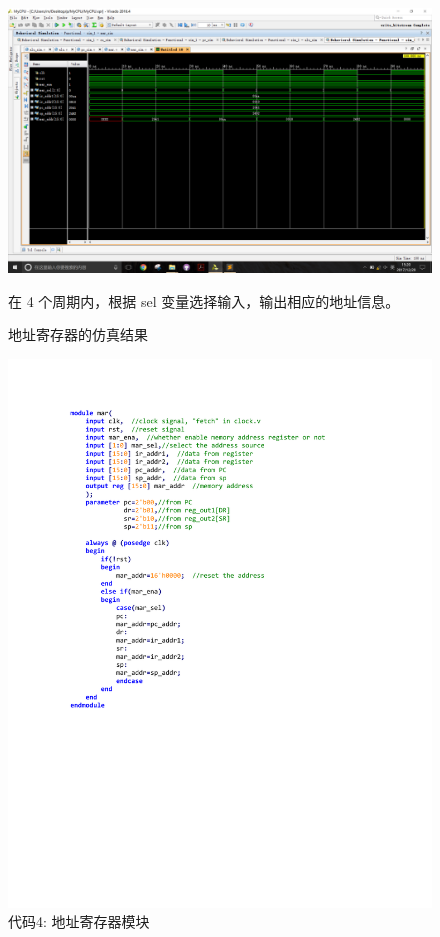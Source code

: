 \documentclass[titlepage, 11pt]{article}
\begin{document}
			\begin{figure}[H]
				\centering
				\includegraphics[scale=0.4]{mar.png}
				\caption{地址寄存器的仿真结果}
				{在 4 个周期内，根据 sel 变量选择输入，输出相应的地址信息。}
		\end{figure}
		\begin{figure}[H]
		\includegraphics[scale=1]{20.pdf}
		\caption*{代码4: 地址寄存器模块}
		\end{figure}
\end{document}
